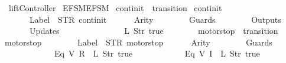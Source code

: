 %
\begin{isabellebody}%
%
%
\isadelimtheory
%
\endisadelimtheory
%
\isatagtheory
{}\isamarkupfalse%
\ liftController{}\isanewline
{}\ {\isachardoublequoteopen}EFSM{\isachardot}EFSM{\isachardoublequoteclose}\isanewline
{}%
\endisatagtheory
{\isafoldtheory}%
%
\isadelimtheory
\isanewline
%
\endisadelimtheory
\isanewline
{}\isamarkupfalse%
\ {\isachardoublequoteopen}continit{\isachardoublequoteclose}\ {\isacharcolon}{\isacharcolon}\ {\isachardoublequoteopen}transition{\isachardoublequoteclose}\ \isanewline
{\isachardoublequoteopen}continit\ {\isasymequiv}\ {\isasymlparr}\isanewline
\ \ \ \ \ \ Label\ {\isacharequal}\ STR\ {\isacharprime}{\isacharprime}continit{\isacharprime}{\isacharprime}{\isacharcomma}\isanewline
\ \ \ \ \ \ Arity\ {\isacharequal}\ {}{\isacharcomma}\isanewline
\ \ \ \ \ \ Guards\ {\isacharequal}\ {\isacharbrackleft}{\isacharbrackright}{\isacharcomma}\isanewline
\ \ \ \ \ \ Outputs\ {\isacharequal}\ {\isacharbrackleft}{\isacharbrackright}{\isacharcomma}\isanewline
\ \ \ \ \ \ Updates\ {\isacharequal}\ {\isacharbrackleft}\isanewline
\ \ \ \ \ \ \ \ \ \ \ \ {\isacharparenleft}{}{\isacharcomma}\ {\isacharparenleft}L\ {\isacharparenleft}Str\ {\isacharprime}{\isacharprime}true{\isacharprime}{\isacharprime}{\isacharparenright}{\isacharparenright}{\isacharparenright}\isanewline
\ \ \ \ \ \ {\isacharbrackright}\isanewline
{\isasymrparr}{\isachardoublequoteclose}\isanewline
\isanewline
{}\isamarkupfalse%
\ {\isachardoublequoteopen}motorstop{}{\isachardoublequoteclose}\ {\isacharcolon}{\isacharcolon}\ {\isachardoublequoteopen}transition{\isachardoublequoteclose}\ \isanewline
{\isachardoublequoteopen}motorstop{}\ {\isasymequiv}\ {\isasymlparr}\isanewline
\ \ \ \ \ \ Label\ {\isacharequal}\ STR\ {\isacharprime}{\isacharprime}motorstop{\isacharprime}{\isacharprime}{\isacharcomma}\isanewline
\ \ \ \ \ \ Arity\ {\isacharequal}\ {}{\isacharcomma}\isanewline
\ \ \ \ \ \ Guards\ {\isacharequal}\ {\isacharbrackleft}\isanewline
\ \ \ \ \ \ \ \ \ \ \ \ {\isacharparenleft}Eq\ {\isacharparenleft}V\ {\isacharparenleft}R\ {}{\isacharparenright}{\isacharparenright}\ {\isacharparenleft}L\ {\isacharparenleft}Str\ {\isacharprime}{\isacharprime}true{\isacharprime}{\isacharprime}{\isacharparenright}{\isacharparenright}{\isacharparenright}{\isacharcomma}\isanewline
\ \ \ \ \ \ \ \ \ \ \ \ {\isacharparenleft}Eq\ {\isacharparenleft}V\ {\isacharparenleft}I\ {}{\isacharparenright}{\isacharparenright}\ {\isacharparenleft}L\ {\isacharparenleft}Str\ {\isacharprime}{\isacharprime}true{\isacharprime}{\isacharprime}{\isacharparenright}{\isacharparenright}{\isacharparenright}{\isacharcomma}\isanewline

\end{isabellebody}
